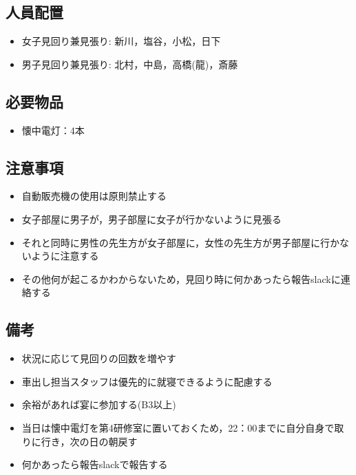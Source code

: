 




\subsection{人員配置}
\begin{itemize}
\item 女子見回り兼見張り: 新川，塩谷，小松，日下
\item 男子見回り兼見張り: 北村，中島，高橋(龍)，斎藤
\end{itemize}


\subsection{必要物品}
\begin{itemize}
\item 懐中電灯：4本
\end{itemize}


\subsection{注意事項}
\begin{itemize}
\item 自動販売機の使用は原則禁止する
\item 女子部屋に男子が，男子部屋に女子が行かないように見張る
\item それと同時に男性の先生方が女子部屋に，女性の先生方が男子部屋に行かないように注意する
\item その他何が起こるかわからないため，見回り時に何かあったら報告slackに連絡する
\end{itemize}

\subsection{備考}
\begin{itemize}
\item 状況に応じて見回りの回数を増やす
\item 車出し担当スタッフは優先的に就寝できるように配慮する
\item 余裕があれば宴に参加する(B3以上)
\item 当日は懐中電灯を第4研修室に置いておくため，22：00までに自分自身で取りに行き，次の日の朝戻す
\item 何かあったら報告slackで報告する
\end{itemize}

%
